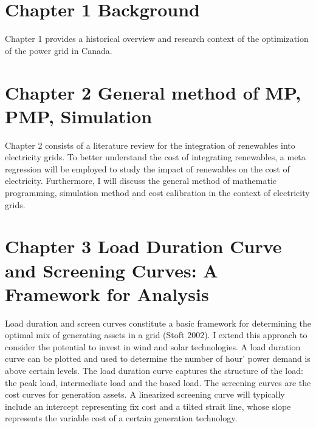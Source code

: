 
\label{dissertation-outline}

\section{Chapter 1 Background }\label{chapter-1-background}

Chapter 1 provides a historical overview and research context of the
optimization of the power grid in Canada.

\section{Chapter 2 General method of MP, PMP,
	Simulation}\label{chapter-2-general-method-of-mp-pmp-simulation}

Chapter 2 consists of a literature review for the integration of
renewables into electricity grids. To better understand the cost of
integrating renewables, a meta regression will be employed to study the
impact of renewables on the cost of electricity. Furthermore, I will
discuss the general method of mathematic programming, simulation method
and cost calibration in the context of electricity grids.

\section{Chapter 3 Load Duration Curve and Screening Curves: A
	Framework for
	Analysis}\label{chapter-3-load-duration-curve-and-screening-curves-a-framework-for-analysis}

Load duration and screen curves constitute a basic framework for
determining the optimal mix of generating assets in a grid (Stoft 2002).
I extend this approach to consider the potential to invest in wind and
solar technologies. A load duration curve can be plotted and used to
determine the number of hour' power demand is above certain levels. The
load duration curve captures the structure of the load: the peak load,
intermediate load and the based load. The screening curves are the cost
curves for generation assets. A linearized screening curve will
typically include an intercept representing fix cost and a tilted strait
line, whose slope represents the variable cost of a certain generation
technology.

